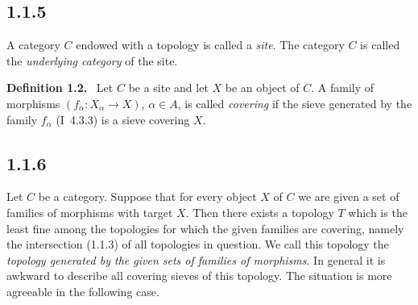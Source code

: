 \documentclass[11pt]{article}
\newenvironment{statement}[1]{\par\medskip\noindent\textbf{#1.}\ }{\par\medskip}
\begin{document}
\subsection*{1.1.5}
A category \(C\) endowed with a topology is called a \emph{site}. The category \(C\) is called the \emph{underlying category} of the site.

\begin{statement}{Definition 1.2}
Let \(C\) be a site and let \(X\) be an object of \(C\). A family of morphisms \((f_\alpha:X_\alpha\to X)\), \(\alpha\in A\), is called \emph{covering} if the sieve generated by the family \(f_\alpha\) (I~4.3.3) is a sieve covering \(X\).
\end{statement}

\subsection*{1.1.6}
Let \(C\) be a category. Suppose that for every object \(X\) of \(C\) we are given a set of families of morphisms with target \(X\). Then there exists a topology \(T\) which is the least fine among the topologies for which the given families are covering, namely the intersection (1.1.3) of all topologies in question. We call this topology the \emph{topology generated by the given sets of families of morphisms}. In general it is awkward to describe all covering sieves of this topology. The situation is more agreeable in the following case.
\end{document}
